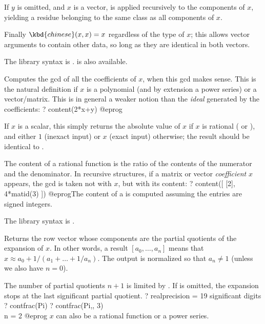 If $y$ is omitted, and $x$ is a vector,  is applied recursively
to the components of $x$, yielding a residue belonging to the same class as all
components of $x$.

Finally $\kbd{chinese}(x,x) = x$ regardless of the type of $x$; this allows
vector arguments to contain other data, so long as they are identical in both
vectors.

The library syntax is .
 is also available.

\label{se:content}
Computes the gcd of all the coefficients of $x$,
when this gcd makes sense. This is the natural definition
if $x$ is a polynomial (and by extension a power series) or a
vector/matrix. This is in general a weaker notion than the \emph{ideal}
generated by the coefficients:
\bprog
? content(2*x+y)
@eprog

If $x$ is a scalar, this simply returns the absolute value of $x$ if $x$ is
rational ( or ), and either $1$ (inexact input) or $x$
(exact input) otherwise; the result should be identical to .

The content of a rational function is the ratio of the contents of the
numerator and the denominator. In recursive structures, if a
matrix or vector \emph{coefficient} $x$ appears, the gcd is taken
not with $x$, but with its content:
\bprog
? content([ [2], 4*matid(3) ])
@eprog\noindent The content of a  is computed assuming the
entries are signed integers.

The library syntax is .

\label{se:contfrac}
Returns the row vector whose components are the partial quotients of the
 expansion of $x$. In other words, a result
$[a_0,\dots,a_n]$ means that $x \approx a_0+1/(a_1+\dots+1/a_n)$. The
output is normalized so that $a_n \neq 1$ (unless we also have $n = 0$).

The number of partial quotients $n+1$ is limited by . If
 is omitted, the expansion stops at the last significant partial
quotient.
\bprog
? 
  realprecision = 19 significant digits
? contfrac(Pi)
? contfrac(Pi,, 3)  \\ n = 2
@eprog\noindent
$x$ can also be a rational function or a power series.

